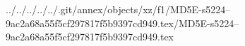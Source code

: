 ../../../../../.git/annex/objects/xz/f1/MD5E-s5224--9ac2a68a55f5cf297817f5b9397cd949.tex/MD5E-s5224--9ac2a68a55f5cf297817f5b9397cd949.tex